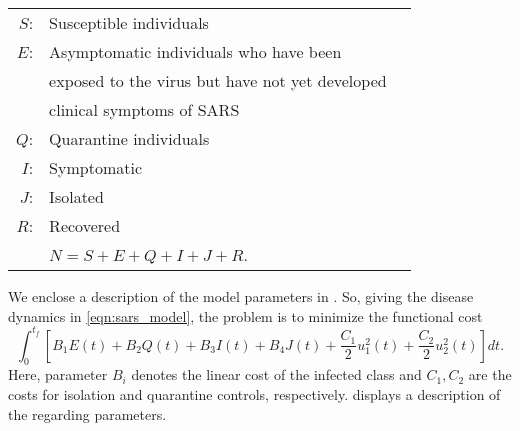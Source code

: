 \begin{table}[h!]
	\begin{center}
		\begin{tabular}{@{}rll@{}} 
			$S$: & Susceptible individuals 
			\\
			$E$: & Asymptomatic individuals who have been 
			\\
			   & exposed to the virus but have not yet developed 
			\\
			   & clinical symptoms of SARS 
			\\
			$Q$: & Quarantine individuals
			\\
			$I$: & Symptomatic 
			\\
			$J$: & Isolated
			\\
			$R$: & Recovered
			\\
				& $N = S + E + Q + I + J + R$.
		\end{tabular}
	\end{center}
\end{table}
We enclose a description of the model parameters 
in .
So, giving the disease dynamics in \eqref{eqn:sars_model}, the problem is to 
minimize the functional cost
\begin{equation}\label{eqn:sars_cost}
  \int_{0}^{t_f}
      \left[
        B_1 E(t)
        + B_2 Q(t)
        + B_3 I(t)
        + B_4 J(t)
        + \frac{C_1}{2} u_1^2 (t)
        + \frac{C_2}{2} u_2^2 (t)
      \right]
      dt.
\end{equation}
Here, parameter $B_i$ denotes the linear cost of the infected 
class and $C_1, C_2$ are the costs for isolation and quarantine controls, respectively.
 displays a description of the regarding parameters.
%
